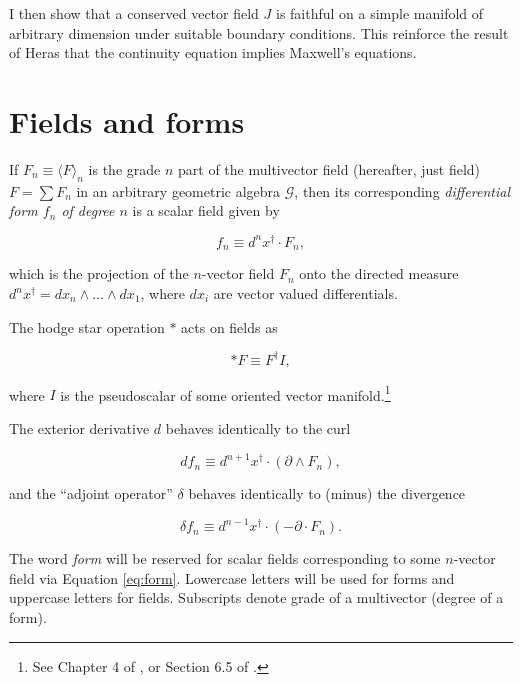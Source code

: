 \documentclass{article}
\begin{document}
I then show that a conserved vector field $J$ is faithful on a simple manifold of arbitrary dimension under suitable boundary conditions. This reinforce the result of Heras that the continuity equation implies Maxwell's equations.

\section{Fields and forms} If $F_n \equiv \langle F \rangle_n$ is the grade $n$ part of the multivector field (hereafter, just field) $F = \sum F_n$ in an arbitrary geometric algebra $\mathcal{G}$, then its corresponding \emph{differential form $f_n$ of degree $n$} is a scalar field given by \cite{cagc}

\begin{equation}
  f_n \equiv d^nx^\dagger \cdot F_n,\label{eq:form}
\end{equation}

which is the projection of the $n$-vector field $F_n$ onto the directed measure $d^nx^\dagger = dx_n \wedge \dots \wedge dx_1$, where $dx_i$ are vector valued differentials. 

The hodge star operation $*$ acts on fields as

\begin{equation}
  *F \equiv F^\dagger I,\label{eq:hodge}
\end{equation}

where $I$ is the pseudoscalar of some oriented vector manifold.\footnote{See Chapter 4 of \cite{cagc}, or Section 6.5 of \cite{gap}.}

The exterior derivative $d$ behaves identically to the curl

\begin{equation}
  d f_n \equiv d^{n+1}x^\dagger \cdot (\partial \wedge F_n),\label{eq:curl}
\end{equation}

and the ``adjoint operator'' $\delta$ behaves identically to (minus) the divergence

\begin{equation}
  \delta f_n \equiv d^{n-1}x^\dagger \cdot (-\partial \cdot F_n).\label{eq:divergence}
\end{equation} 

The word \emph{form} will be reserved for scalar fields corresponding to some $n$-vector field via Equation \ref{eq:form}. Lowercase letters will be used for forms and uppercase letters for fields. Subscripts denote grade of a multivector (degree of a form).
\end{document}
